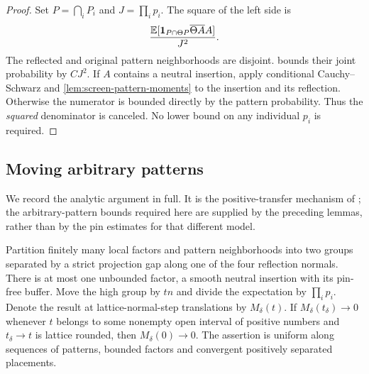 \begin{proof}
Set $P=\bigcap_iP_i$ and $J=\prod_i p_i$. The square of the left side is
\[
 \frac{\mathbb E[\mathbf 1_{P\cap\Theta P}\overline{\Theta A}A]}{J^2}.
\]
The reflected and original pattern neighborhoods are disjoint.
 bounds their joint probability by
$CJ^2$. If $A$ contains a neutral insertion, apply conditional
Cauchy--Schwarz and \cref{lem:screen-pattern-moments} to the insertion
and its reflection. Otherwise the numerator is bounded directly by the
pattern probability. Thus the \emph{squared} denominator is canceled.
No lower bound on any individual $p_i$ is required.
\end{proof}

\subsection{Moving arbitrary patterns}

We record the analytic argument in full. It is the positive-transfer
mechanism of \cite[Section~7]{Triangular}; the arbitrary-pattern bounds
required here are supplied by the preceding lemmas, rather than by the
pin estimates for that different model.

\begin{lemma}
\label{lem:screen-analytic-translation}
Partition finitely many local factors and pattern neighborhoods into two
groups separated by a strict projection gap along one of the four
reflection normals. There is at most one unbounded factor, a smooth
neutral insertion with its pin-free buffer. Move the high group by $tn$
and divide the expectation by $\prod_i p_i$. Denote the result at
lattice-normal-step translations by $M_\delta(t)$. If
$M_\delta(t_\delta)\to0$ whenever $t$ belongs to some nonempty open
interval of positive numbers and $t_\delta\to t$ is lattice rounded,
then $M_\delta(0)\to0$. The assertion is uniform along sequences of
patterns, bounded factors and convergent positively separated placements.
\end{lemma}


